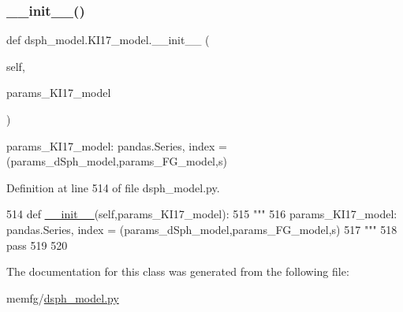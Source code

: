\subsubsection{\texorpdfstring{\+\_\+\+\_\+init\+\_\+\+\_\+()}{\_\_init\_\_()}}
{\footnotesize\ttfamily def dsph\+\_\+model.\+K\+I17\+\_\+model.\+\_\+\+\_\+init\+\_\+\+\_\+ (\begin{DoxyParamCaption}\item[{}]{self,  }\item[{}]{params\+\_\+\+K\+I17\+\_\+model }\end{DoxyParamCaption})}

\begin{DoxyVerb}params_KI17_model: pandas.Series, index = (params_dSph_model,params_FG_model,s)
\end{DoxyVerb}
 

Definition at line 514 of file dsph\+\_\+model.\+py.


\begin{DoxyCode}
514     \textcolor{keyword}{def }\hyperlink{classsampler_1_1Sampler_a0ebbb93e5c948bc426658cbdc92bfd12}{\_\_init\_\_}(self,params\_KI17\_model):
515         \textcolor{stringliteral}{"""}
516 \textcolor{stringliteral}{        params\_KI17\_model: pandas.Series, index = (params\_dSph\_model,params\_FG\_model,s)}
517 \textcolor{stringliteral}{        """}
518         \textcolor{keywordflow}{pass}
519 
520 
\end{DoxyCode}


The documentation for this class was generated from the following file\+:\begin{DoxyCompactItemize}
\item 
memfg/\hyperlink{dsph__model_8py}{dsph\+\_\+model.\+py}\end{DoxyCompactItemize}
